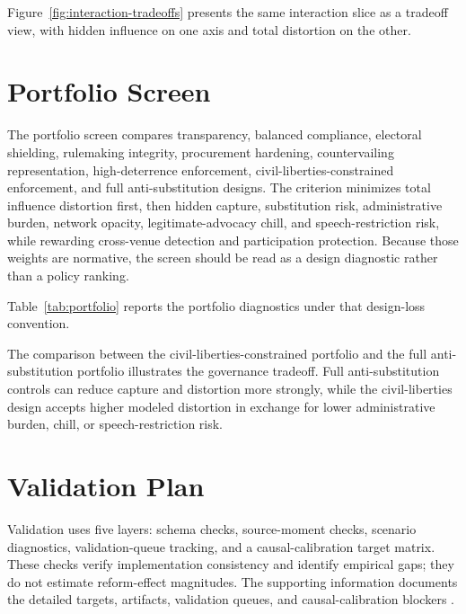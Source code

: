 

Figure~\ref{fig:interaction-tradeoffs} presents the same interaction slice as a tradeoff view, with hidden influence on one axis and total distortion on the other.



\section{Portfolio Screen}

The portfolio screen compares transparency, balanced compliance, electoral shielding, rulemaking integrity, procurement hardening, countervailing representation, high-deterrence enforcement, civil-liberties-constrained enforcement, and full anti-substitution designs. The criterion minimizes total influence distortion first, then hidden capture, substitution risk, administrative burden, network opacity, legitimate-advocacy chill, and speech-restriction risk, while rewarding cross-venue detection and participation protection. Because those weights are normative, the screen should be read as a design diagnostic rather than a policy ranking.

Table~\ref{tab:portfolio} reports the portfolio diagnostics under that design-loss convention.



The comparison between the civil-liberties-constrained portfolio and the full anti-substitution portfolio illustrates the governance tradeoff. Full anti-substitution controls can reduce capture and distortion more strongly, while the civil-liberties design accepts higher modeled distortion in exchange for lower administrative burden, chill, or speech-restriction risk.

\section{Validation Plan}

Validation uses five layers: schema checks, source-moment checks, scenario diagnostics, validation-queue tracking, and a causal-calibration target matrix. These checks verify implementation consistency and identify empirical gaps; they do not estimate reform-effect magnitudes. The supporting information documents the detailed targets, artifacts, validation queues, and causal-calibration blockers \citep{ldaData,fecData,federalRegisterApi,regulationsGovApi,nycCfbData,seattleVouchers,irsEoBmf,usaspending}.

